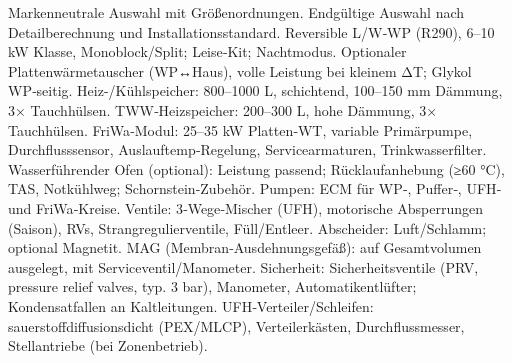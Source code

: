 \markdownRendererDocumentBegin
\markdownRendererSectionBegin
{}\markdownRendererInterblockSeparator
{}Markenneutrale Auswahl mit Größenordnungen. Endgültige Auswahl nach Detailberechnung und Installationsstandard.\markdownRendererInterblockSeparator
{}\markdownRendererSectionBegin
{}\markdownRendererInterblockSeparator
{}\markdownRendererUlBeginTight
\markdownRendererUlItem Reversible L/W‑WP (R290), 6–10 kW Klasse, Monoblock/Split; Leise‑Kit; Nachtmodus.\markdownRendererUlItemEnd 
\markdownRendererUlItem Optionaler Plattenwärmetauscher (WP↔Haus), volle Leistung bei kleinem ΔT; Glykol WP‑seitig.\markdownRendererUlItemEnd 
\markdownRendererUlItem Heiz-/Kühlspeicher: 800–1000 L, schichtend, 100–150 mm Dämmung, 3× Tauchhülsen.\markdownRendererUlItemEnd 
\markdownRendererUlItem TWW‑Heizspeicher: 200–300 L, hohe Dämmung, 3× Tauchhülsen.\markdownRendererUlItemEnd 
\markdownRendererUlItem FriWa‑Modul: 25–35 kW Platten‑WT, variable Primärpumpe, Durchflusssensor, Auslauftemp‑Regelung, Servicearmaturen, Trinkwasserfilter.\markdownRendererUlItemEnd 
\markdownRendererUlItem Wasserführender Ofen (optional): Leistung passend; Rücklaufanhebung (≥60 °C), TAS, Notkühlweg; Schornstein‑Zubehör.\markdownRendererUlItemEnd 
\markdownRendererUlEndTight \markdownRendererInterblockSeparator
{}
\markdownRendererSectionEnd \markdownRendererSectionBegin
{}\markdownRendererInterblockSeparator
{}\markdownRendererUlBeginTight
\markdownRendererUlItem Pumpen: ECM für WP‑, Puffer‑, UFH‑ und FriWa‑Kreise.\markdownRendererUlItemEnd 
\markdownRendererUlItem Ventile: 3‑Wege‑Mischer (UFH), motorische Absperrungen (Saison), RVs, Strangregulierventile, Füll/Entleer.\markdownRendererUlItemEnd 
\markdownRendererUlItem Abscheider: Luft/Schlamm; optional Magnetit.\markdownRendererUlItemEnd 
\markdownRendererUlItem MAG (Membran‑Ausdehnungsgefäß): auf Gesamtvolumen ausgelegt, mit Serviceventil/Manometer.\markdownRendererUlItemEnd 
\markdownRendererUlItem Sicherheit: Sicherheitsventile (PRV, pressure relief valves, typ. 3 bar), Manometer, Automatikentlüfter; Kondensatfallen an Kaltleitungen.\markdownRendererUlItemEnd 
\markdownRendererUlEndTight \markdownRendererInterblockSeparator
{}
\markdownRendererSectionEnd \markdownRendererSectionBegin
{}\markdownRendererInterblockSeparator
{}\markdownRendererUlBeginTight
\markdownRendererUlItem UFH‑Verteiler/Schleifen: sauerstoffdiffusionsdicht (PEX/MLCP), Verteilerkästen, Durchflussmesser, Stellantriebe (bei Zonenbetrieb).\markdownRendererUlItemEnd 
